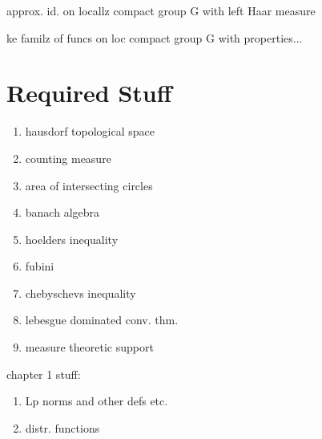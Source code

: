 \begin{theorem}
approx. id. on locallz compact group G with left Haar measure
\end{theorem}

\begin{theorem}
ke familz of funcs on loc compact group G with properties...
\end{theorem}

\section{Required Stuff}

\begin{enumerate}
\item hausdorf topological space
\item counting measure
\item area of intersecting circles
\item banach algebra
\item hoelders inequality
\item fubini
\item chebyschevs inequality
\item lebesgue dominated conv. thm.
\item measure theoretic support
\end{enumerate}

chapter 1 stuff:
\begin{enumerate}
\item Lp norms and other defs etc.
\item distr. functions
\end{enumerate}

